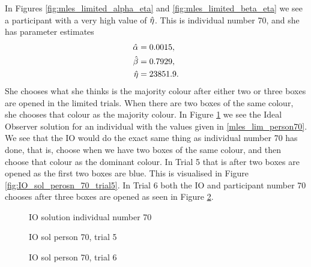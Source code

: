 In Figures \ref{fig:mles_limited_alpha_eta} and \ref{fig:mles_limited_beta_eta} we see a participant with a very high value of $\hat{\eta}$. This is individual number 70, and she has  parameter estimates
\begin{equation}
\label{mles_lim_person70}
    \begin{aligned}
        \hat{\alpha} &= 0.0015,\\
        \hat{\beta} &= 0.7929,\\
        \hat{\eta} &= 23851.9.
    \end{aligned}
\end{equation}
She chooses what she thinks is the majority colour after either two or three boxes are opened in the limited trials. When there are two boxes of the same colour, she chooses that colour as the majority colour. In Figure \ref{fig:IO_sol_person_70} we see the Ideal Observer solution for an individual with the values given in \eqref{mles_lim_person70}. We see that the IO would do the exact same thing as individual number 70 has done, that is, choose when we have two boxes of the same colour, and then choose that colour as the dominant colour. In Trial 5 that is after two boxes are opened as the first two boxes are blue. This is visualised in Figure \ref{fig:IO_sol_perosn_70_trial5}. In Trial 6 both the IO and participant number 70 chooses after three boxes are opened as seen in Figure \ref{fig:IO_sol_person70_trial6}.
\begin{figure}
    \centering
    \scalebox{0.7}{}
    \caption{IO solution individual number 70}
    \label{fig:IO_sol_person_70}
\end{figure}

\begin{figure}
    \centering
    \begin{minipage}{0.48\textwidth}
        \centering
        \scalebox{0.7}{}
        \caption{IO sol person 70, trial 5}
        \label{fig:IO_sol_perosn_70_trial5}
    \end{minipage}
    \hfill
    \begin{minipage}{0.48\textwidth}
        \centering
        \scalebox{0.7}{}
        \caption{IO sol person 70, trial 6}
        \label{fig:IO_sol_person70_trial6}
    \end{minipage}
\end{figure}

